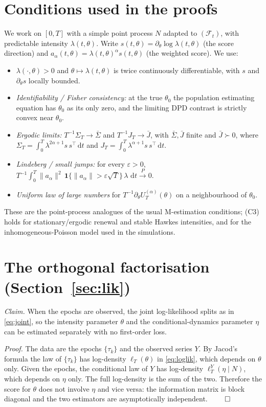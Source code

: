 \documentclass[smallextended,natbib]{svjour3}
\newcommand{\dd}{\,\mathrm{d}}
\newcommand{\F}{\mathcal{F}}
\newcommand{\toP}{\xrightarrow{P}}
\begin{document}
\section{Conditions used in the proofs}
\label{app:cond}
We work on $[0,T]$ with a simple point process $N$ adapted to $(\F_t)$, with
predictable intensity $\lambda(t,\theta)$. Write
$s(t,\theta)=\partial_\theta\log\lambda(t,\theta)$ (the score direction) and
$a_\alpha(t,\theta)=\lambda(t,\theta)^{\alpha}s(t,\theta)$ (the weighted score).
We use:
\begin{itemize}
\item[(C1)] $\lambda(\cdot,\theta)>0$ and $\theta\mapsto\lambda(t,\theta)$ is twice
continuously differentiable, with $s$ and $\partial_\theta s$ locally bounded.
\item[(C2)] \emph{Identifiability / Fisher consistency:} at the true $\theta_0$ the
population estimating equation has $\theta_0$ as its only zero, and the limiting
DPD contrast is strictly convex near $\theta_0$.
\item[(C3)] \emph{Ergodic limits:} $T^{-1}\Sigma_T\to\bar\Sigma$ and
$T^{-1}J_T\to\bar J$, with $\bar\Sigma,\bar J$ finite and $\bar J\succ0$, where
$\Sigma_T=\int_0^T \lambda^{2\alpha+1}s\,s^{\top}\dd t$ and
$J_T=\int_0^T \lambda^{\alpha+1}s\,s^{\top}\dd t$.
\item[(C4)] \emph{Lindeberg / small jumps:} for every $\varepsilon>0$,
$T^{-1}\int_0^T \|a_\alpha\|^2\,\mathbf 1\{\|a_\alpha\|>\varepsilon\sqrt T\}\,\lambda\,\dd t\toP0$.
\item[(C5)] \emph{Uniform law of large numbers} for $T^{-1}\partial_\theta U_T^{(\alpha)}(\theta)$
on a neighbourhood of $\theta_0$.
\end{itemize}
These are the point-process analogues of the usual M-estimation conditions; (C3)
holds for stationary/ergodic renewal and stable Hawkes intensities, and for the
inhomogeneous-Poisson model used in the simulations.

\section{The orthogonal factorisation (Section~\ref{sec:lik})}
\label{app:fact}
\emph{Claim.} When the epochs are observed, the joint log-likelihood splits as in
\eqref{eq:joint}, so the intensity parameter $\theta$ and the conditional-dynamics
parameter $\eta$ can be estimated separately with no first-order loss.

\emph{Proof.} The data are the epochs $\{\tau_k\}$ and the observed series
$Y$. By Jacod's formula the law of $\{\tau_k\}$ has log-density $\ell_T(\theta)$ in
\eqref{eq:loglik}, which depends on $\theta$ only. Given the epochs, the
conditional law of $Y$ has log-density $\ell_T^Y(\eta\mid N)$, which depends on
$\eta$ only. The full log-density is the sum of the two. Therefore the score for
$\theta$ does not involve $\eta$ and vice versa: the information matrix is block
diagonal and the two estimators are asymptotically independent. $\qed$
\end{document}
